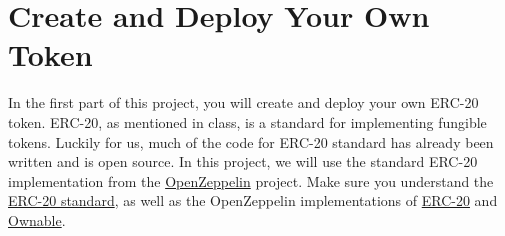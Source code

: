 \documentclass[11pt]{article}
\begin{document}
\begin{comment}
\item Open \texttt{index.html} in your browser (works best in Chrome) to access the user interface through which you can test your exchange. On this page, you can pick an address and add liquidity, remove liquidity, and swap your token for ETH and vice-versa.

\item It's very helpful to also open your browser's JavaScript console, so that you can see \texttt{console.log()} messages and error messages. If everything so far is working, you should see no errors in the console (you can safely ignore warnings).

\item Implement code for the requirements outlined below. When you have your contract, compile and deploy it, and then \textbf{update the contract address and ABI} at the top of \texttt{exchange.js}. The ABI can be copied to the clipboard from the `Solidity Compiler' tab, and the contract hash can be copied from the `Deploy and Run Transactions' tab. Note that the contract hash is \textit{not} the transaction hash of the transaction that created the contract.

\\ \\
TODO: Add instructions on installing openzepellin: npm install @openzeppelin/contracts

\end{enumerate}
\end{comment}

\section{Create and Deploy Your Own Token}

In the first part of this project, you will create and deploy your own ERC-20 token. ERC-20, as mentioned in class, is a standard for implementing fungible tokens. Luckily for us, much of the code for ERC-20 standard has already been written and is open source. In this project, we will use the standard ERC-20 implementation from the \href{https://openzeppelin.com/contracts/}{OpenZeppelin} project. Make sure you understand the \href{https://ethereum.org/en/developers/docs/standards/tokens/erc-20/}{ERC-20 standard}, as well as the OpenZeppelin implementations of \href{https://docs.openzeppelin.com/contracts/4.x/erc20}{ERC-20} and \href{https://docs.openzeppelin.com/contracts/2.x/access-control}{Ownable}.
\end{document}
